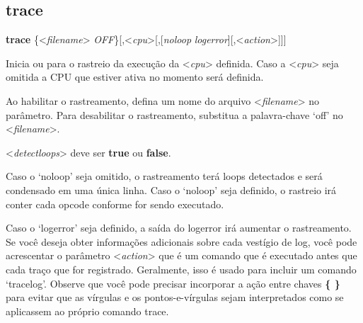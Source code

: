 \documentclass[letterpaper,10pt,brazil]{sphinxmanual}
\begin{document}
\subsection{trace}
\label{debugger/execution:trace}\label{debugger/execution:debugger-command-trace}
\begin{DUlineblock}{0em}
\item[]
\begin{DUlineblock}{\DUlineblockindent}
\item[] \textbf{trace} \{\textless{}\emph{filename}\textgreater{} \textbar{} \emph{OFF}\}{[},\textless{}\emph{cpu}\textgreater{}{[},{[}\emph{noloop} \textbar{} \emph{logerror}{]}{[},\textless{}\emph{action}\textgreater{}{]}{]}{]}
\item[] 
\end{DUlineblock}
\item[] Inicia ou para o rastreio da execução da \textless{}\emph{cpu}\textgreater{} definida. Caso a \textless{}\emph{cpu}\textgreater{} seja omitida a CPU que estiver ativa no momento será definida.
\item[] 
\item[] Ao habilitar o rastreamento, defina um nome do arquivo \textless{}\emph{filename}\textgreater{} no parâmetro. Para desabilitar o rastreamento, substitua a palavra-chave `off' no \textless{}\emph{filename}\textgreater{}.
\item[] 
\item[] \textless{}\emph{detectloops}\textgreater{} deve ser \textbf{true} ou \textbf{false}.
\item[] 
\item[] Caso o `noloop' seja omitido, o rastreamento terá loops detectados e será condensado em uma única linha. Caso o `noloop' seja definido, o rastreio irá conter cada opcode conforme for sendo executado.
\item[] 
\item[] Caso o `logerror' seja definido, a saída do logerror irá aumentar o rastreamento. Se você deseja obter informações adicionais sobre cada vestígio de log, você pode acrescentar o parâmetro \textless{}\emph{action}\textgreater{} que é um comando que é executado antes que cada traço que for registrado. Geralmente, isso é usado para incluir um comando `tracelog'. Observe que você pode precisar incorporar a ação entre chaves \textbf{\{ \}} para evitar que as vírgulas e os pontos-e-vírgulas sejam interpretados como se aplicassem ao próprio comando trace.
\item[] 
\item[] 

\end{DUlineblock}
\end{document}
